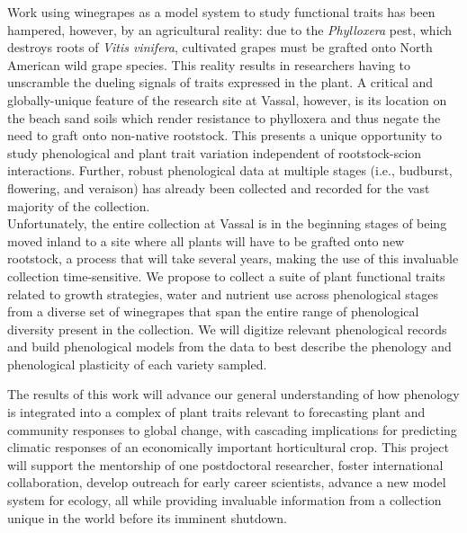 \documentclass[10pt,letter,oneside]{article}
\begin{document}
Work using winegrapes as a model system to study functional traits has been hampered, however, by an agricultural reality: due to the \emph{Phylloxera} pest, which destroys roots of \emph{Vitis vinifera}, cultivated grapes must be grafted onto North American wild grape species. This reality results in researchers having to unscramble the dueling signals of traits expressed in the plant. A critical and globally-unique feature of the research site at Vassal, however, is its location on the beach sand soils which render resistance to phylloxera and thus negate the need to graft onto non-native rootstock. This presents a unique opportunity to study phenological and plant trait variation independent of rootstock-scion interactions. Further, robust phenological data at multiple stages (i.e., budburst, flowering, and veraison) has already been collected and recorded for the vast majority of the collection. \\

Unfortunately, the entire collection at Vassal is in the beginning stages of being moved inland to a site where all plants will have to be grafted onto new rootstock, a process that will take several years, making the use of this invaluable collection time-sensitive. We propose to collect a suite of plant functional traits related to growth strategies, water and nutrient use across phenological stages from a diverse set of winegrapes that span the entire range of phenological diversity present in the collection. We will digitize relevant phenological records and build phenological models from the data to best describe the phenology and phenological plasticity of each variety sampled. 

The results of this work will advance our general understanding of how phenology is integrated into a complex of plant traits relevant to forecasting  plant and community responses to global change, with cascading implications for predicting climatic responses of an economically important horticultural crop. This project will support the mentorship of one postdoctoral researcher, foster international collaboration, develop outreach for early career scientists, advance a new model system for ecology, all while providing invaluable information from a collection unique in the world before its imminent shutdown.\\ 
\end{document}
